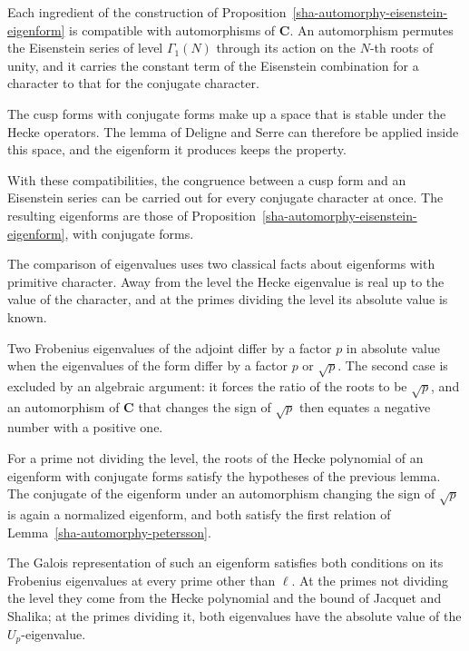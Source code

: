 Each ingredient of the construction of Proposition~\ref{sha-automorphy-eisenstein-eigenform} is compatible with automorphisms of $\mathbf C$. An automorphism permutes the Eisenstein series of level $\Gamma_1(N)$ through its action on the $N$-th roots of unity, and it carries the constant term of the Eisenstein combination for a character to that for the conjugate character.

The cusp forms with conjugate forms make up a space that is stable under the Hecke operators. The lemma of Deligne and Serre can therefore be applied inside this space, and the eigenform it produces keeps the property.

With these compatibilities, the congruence between a cusp form and an Eisenstein series can be carried out for every conjugate character at once. The resulting eigenforms are those of Proposition~\ref{sha-automorphy-eisenstein-eigenform}, with conjugate forms.

The comparison of eigenvalues uses two classical facts about eigenforms with primitive character. Away from the level the Hecke eigenvalue is real up to the value of the character, and at the primes dividing the level its absolute value is known.

Two Frobenius eigenvalues of the adjoint differ by a factor $p$ in absolute value when the eigenvalues of the form differ by a factor $p$ or $\sqrt p$. The second case is excluded by an algebraic argument: it forces the ratio of the roots to be $\sqrt p$, and an automorphism of $\mathbf C$ that changes the sign of $\sqrt p$ then equates a negative number with a positive one.

For a prime not dividing the level, the roots of the Hecke polynomial of an eigenform with conjugate forms satisfy the hypotheses of the previous lemma. The conjugate of the eigenform under an automorphism changing the sign of $\sqrt p$ is again a normalized eigenform, and both satisfy the first relation of Lemma~\ref{sha-automorphy-petersson}.

The Galois representation of such an eigenform satisfies both conditions on its Frobenius eigenvalues at every prime other than $\ell$. At the primes not dividing the level they come from the Hecke polynomial and the bound of Jacquet and Shalika; at the primes dividing it, both eigenvalues have the absolute value of the $U_p$-eigenvalue.

